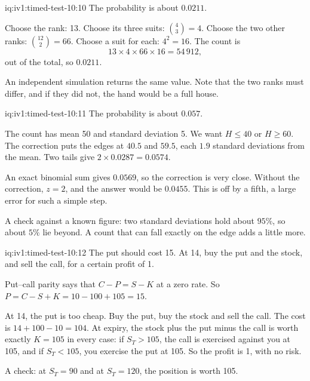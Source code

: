 \enlargethispage{-6\baselineskip}%
\begin{solution}{iq:iv1:timed-test-10:10}
The probability is about $0.0211$.

Choose the rank: 13. Choose its three suits: $\binom43 = 4$. Choose the two other ranks: $\binom{12}{2} = 66$. Choose a suit for each: $4^2 = 16$. The count is
\[
13 \times 4 \times 66 \times 16 = 54\,912,
\]
out of the total, so $0.0211$.

An independent simulation returns the same value. Note that the two ranks must differ, and if they did not, the hand would be a full house.


\end{solution}

\begin{solution}{iq:iv1:timed-test-10:11}
The probability is about $0.057$.

The count has mean 50 and standard deviation 5. We want $H \le 40$ or $H \ge 60$. The correction puts the edges at $40.5$ and $59.5$, each $1.9$ standard deviations from the mean. Two tails give $2 \times 0.0287 = 0.0574$.

An exact binomial sum gives $0.0569$, so the correction is very close. Without the correction, $z = 2$, and the answer would be $0.0455$. This is off by a fifth, a large error for such a simple step.

A check against a known figure: two standard deviations hold about $95\%$, so about $5\%$ lie beyond. A count that can fall exactly on the edge adds a little more.

\end{solution}

\begin{solution}{iq:iv1:timed-test-10:12}
The put should cost 15. At 14, buy the put and the stock, and sell the call, for a certain profit of 1.

Put--call parity says that $C - P = S - K$ at a zero rate. So $P = C - S + K = 10 - 100 + 105 = 15$.

At 14, the put is too cheap. Buy the put, buy the stock and sell the call. The cost is $14 + 100 - 10 = 104$. At expiry, the stock plus the put minus the call is worth exactly $K = 105$ in every case: if $S_T > 105$, the call is exercised against you at 105, and if $S_T < 105$, you exercise the put at 105. So the profit is 1, with no risk.

A check: at $S_T = 90$ and at $S_T = 120$, the position is worth 105.

\end{solution}
